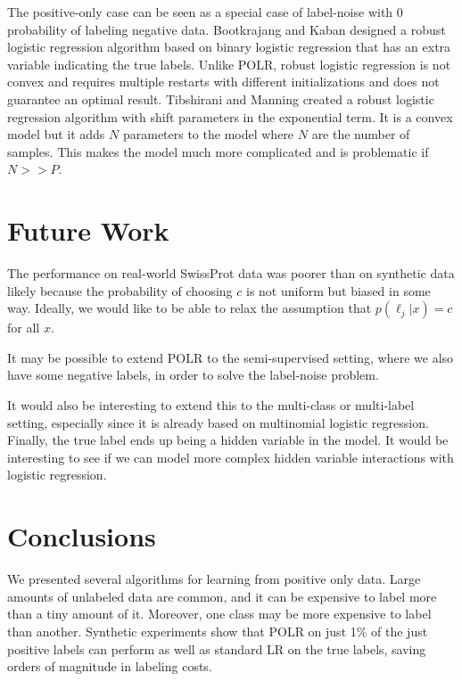 \documentclass{article}
\begin{document}
The positive-only case can be seen as a special case of label-noise with 0 probability of labeling negative data. Bootkrajang and Kaban  designed a robust logistic regression algorithm based on binary logistic regression that has an extra variable indicating the true labels.  Unlike POLR, robust logistic regression is not convex and requires multiple restarts with different initializations and does not guarantee an optimal result. Tibshirani and Manning  created a robust logistic regression algorithm with  shift parameters in the exponential term.  It is a convex model but it adds $N$ parameters to the model where $N$ are the number of samples.  This makes the model much more complicated and is problematic if $N >> P$.

\section{Future Work}

The performance on real-world SwissProt data was poorer than on synthetic data likely because the probability of choosing $c$ is not uniform but biased in some way. Ideally, we would like to be able to relax the assumption that $p(\ell_j|x)=c$ for all $x$.  

It may be possible to extend POLR to the semi-supervised setting, where we also have some negative labels, in order to solve the label-noise problem.

It would also be interesting to extend this to the multi-class or multi-label setting, especially since it is already based on multinomial logistic regression. Finally, the true label ends up being a hidden variable in the model. It would be interesting to see if we can model more complex hidden variable interactions with logistic regression.

\section{Conclusions}

We presented several algorithms for learning from positive only data. Large amounts of unlabeled data are common, and it can be expensive to label more than a tiny amount of it.  Moreover, one class may be more expensive to label than another. Synthetic experiments show that POLR on just 1\% of the just positive labels can perform as well as standard LR on the true labels, saving orders of magnitude in labeling costs.



\end{document}
